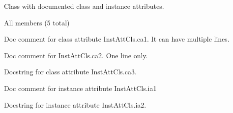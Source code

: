 \documentclass[letterpaper,10pt,english]{sphinxmanual}
\begin{document}
\begin{fulllineitems}
\label{autodoc:test_autodoc.InstAttCls}
Class with documented class and instance attributes.

All members (5 total)

\begin{fulllineitems}
\label{autodoc:test_autodoc.InstAttCls.ca1}
Doc comment for class attribute InstAttCls.ca1.
It can have multiple lines.

\end{fulllineitems}


\begin{fulllineitems}
\label{autodoc:test_autodoc.InstAttCls.ca2}
Doc comment for InstAttCls.ca2. One line only.

\end{fulllineitems}


\begin{fulllineitems}
\label{autodoc:test_autodoc.InstAttCls.ca3}
Docstring for class attribute InstAttCls.ca3.

\end{fulllineitems}


\begin{fulllineitems}
\label{autodoc:test_autodoc.InstAttCls.ia1}
Doc comment for instance attribute InstAttCls.ia1

\end{fulllineitems}


\begin{fulllineitems}
\label{autodoc:test_autodoc.InstAttCls.ia2}
Docstring for instance attribute InstAttCls.ia2.

\end{fulllineitems}


\end{fulllineitems}
\end{document}
